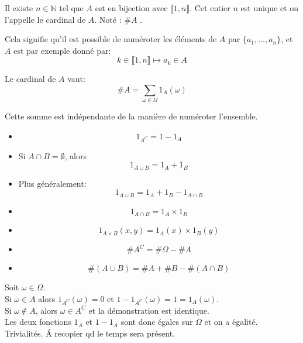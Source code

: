   \begin{definition}
    Il existe $n\in\mathbb{N}$ tel que $A$ est en bijection avec $\llbracket 1,n \rrbracket$.
    Cet entier $n$ est unique et on l'appelle le cardinal de $A$.
    Noté : $\#A$ .%
  \end{definition}

  Cela signifie qu'il est possible de numéroter les éléments de $A$ par $\{a_1, \dots, a_n\}$,
  et $A$ est par exemple donné par:
  \[ k \in \llbracket 1, n \rrbracket \mapsto a_k \in A\]

  \begin{proposition}
    Le cardinal de $A$ vaut:
    \[\#A = \sum_{\omega\in \Omega} 1_A(\omega)\]

    Cette somme est indépendante de la manière de numéroter l'ensemble.
  \end{proposition}

  \begin{proposition}
    \begin{itemize}
      \item \[1_{A^C} = 1-1_A\]
      \item Si $A\cap B = \emptyset$, alors
            \[1_{A\cup B} = 1_A + 1_B\]
      \item Plus généralement:
            \[1_{A\cup B} = 1_A + 1_B - 1_{A\cap B}\]
      \item \[1_{A\cap B} = 1_A \times 1_B\]
      \item \[1_{A\times B}(x,y) = 1_A(x)\times 1_B(y)\]
    \end{itemize}
  \end{proposition}

  \begin{corollaire}
    \begin{itemize}
      \item \[\#A^C = \#\Omega - \#A\]
      \item \[
        \#(A\cup B) = \#A + \#B - \#(A\cap B)
      \]
    \end{itemize}
  \end{corollaire}

  \begin{preuve}
    Soit $\omega\in\Omega$.\\
    Si $\omega\in A$ alors $1_{A^C}(\omega)=0$ et $1-1_{A^C}(\omega) = 1 = 1_A(\omega)$.\\
    Si $\omega\notin A$, alors $\omega\in A^C$ et la démonstration est identique.\\
    Les deux fonctions $1_A$ et $1-1_A$ sont donc égales sur $\Omega$ et on a égalité.\\

    Trivialités. \'A recopier qd le temps sera présent.


  \end{preuve}
